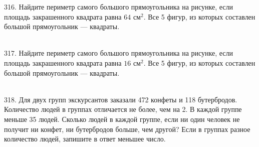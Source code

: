 \documentclass[12pt]{article}
\begin{document}
316. Найдите периметр самого большого прямоугольника на рисунке, если площадь закрашенного квадрата равна $64\text{ см}^2.$ Все 5 фигур, из которых составлен большой прямоугольник --- квадраты.\\
\begin{figure}[ht!]
\end{figure}\\
317. Найдите периметр самого большого прямоугольника на рисунке, если площадь закрашенного квадрата равна $16\text{ см}^2.$ Все 5 фигур, из которых составлен большой прямоугольник --- квадраты.\\
\begin{figure}[ht!]
\end{figure}\\
318. Для двух групп экскурсантов заказали 472 конфеты и 118 бутербродов. Количество людей в группах отличается не более, чем на 2. В каждой группе меньше 35 людей. Сколько людей в каждой группе, если ни один человек не получит ни конфет, ни бутербродов больше, чем другой? Если в группах разное количество людей, запишите в ответ меньшее число.\\
\end{document}
